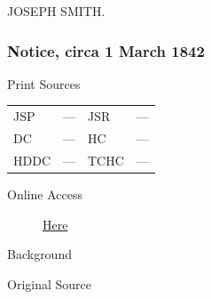 				\begin{tightright}
					JOSEPH SMITH.
				\end{tightright}
				
		\subsubsection{Notice, circa 1 March 1842}
			\label{EMS-1842-JS-CIR-1-MAR-1842}
			
			\begin{description}
				\item[Print Sources]
			\end{description}

			\begin{tabular}{p{0.5in}p{1in}p{0.5in}p{1in}}
				JSP	 	& ---		& JSR 		& --- \\
				DC	 	& ---		& HC 		& --- \\
				HDDC 	& ---		& TCHC 		& --- \\
			\end{tabular}
			
			\begin{description}
				\item[Online Access] \href{https://www.josephsmithpapers.org/paper-summary/notice-circa-1-march-1842/1}{Here}
			\end{description}
			
			\begin{description}
				\item[Background]
			\end{description}
			
			
			\begin{description}
				\item[Original Source]
			\end{description}
			
			
